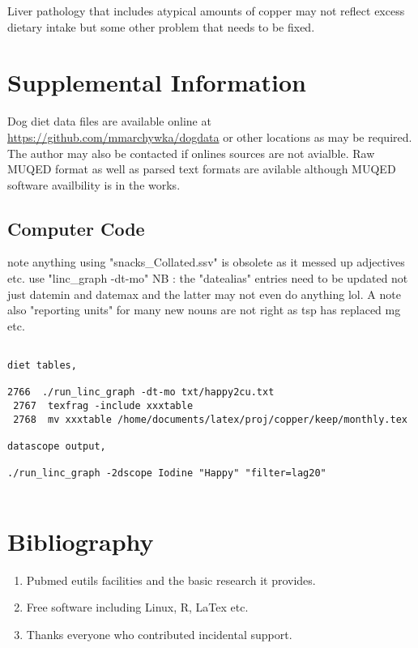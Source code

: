 \documentclass[aps,secnumarabic,balancelastpage,amsmath,amssymb,nofootinbib]{revtex4}
\newcommand{\mjmbasename}{\jobname}
\newcommand{\mjmaddbio}{mjm_tr,releases,potusebib,../casesum/casesum,sbenzbib}
\begin{document}
Liver pathology that includes atypical amounts of copper
may not reflect excess dietary intake but some other problem
that needs to be fixed. 

\section{Supplemental Information}

Dog diet data files are available online at
{\url{https://github.com/mmarchywka/dogdata}}
or other locations as may be required.
The author may also be contacted if onlines sources are not
avialble. Raw MUQED format as well as parsed text formats
are avilable although MUQED software availbility is in the works.


\subsection{Computer Code}
note anything using "snacks\_Collated.ssv" is obsolete as it messed
up adjectives etc. use "linc\_graph -dt-mo"
NB : the "datealias" entries need to be updated not just datemin and datemax
and the latter may not even do anything lol.  A note also
"reporting units" for many new nouns are not right as tsp
 has replaced mg etc. 

\begin{lstlisting}

diet tables, 

2766  ./run_linc_graph -dt-mo txt/happy2cu.txt 
 2767  texfrag -include xxxtable 
 2768  mv xxxtable /home/documents/latex/proj/copper/keep/monthly.tex

datascope output, 

./run_linc_graph -2dscope Iodine "Happy" "filter=lag20"


\end{lstlisting}
\section{Bibliography}






\begin{acknowledgments} 

% 
\begin{enumerate}
\item Pubmed eutils facilities and the basic research it provides. 
\item Free software including Linux, R, LaTex  etc.
\item Thanks everyone who contributed incidental support. 
\end{enumerate}

\end{acknowledgments}
\end{document}
